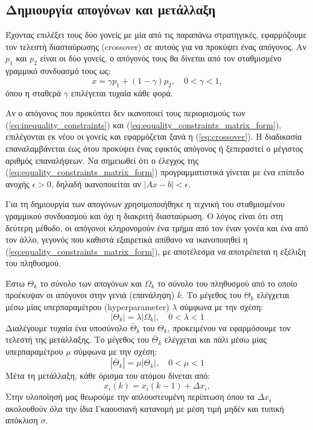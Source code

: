 \documentclass[a4paper,12pt]{article}
\begin{document}
\subsection{Δημιουργία απογόνων και μετάλλαξη}
Έχοντας επιλέξει τους δύο γονείς με μία από τις παραπάνω στρατηγικές, εφαρμόζουμε τον τελεστή διασταύρωσης
(crossover) σε αυτούς για να προκύψει ένας απόγονος. 
Αν $p_1$ και $p_2$ είναι οι δύο γονείς, ο απόγονός τους θα δίνεται από τον σταθμισμένο γραμμικό συνδυασμό τους ως:
\begin{equation}
    x = \gamma p_1 +(1 - \gamma) p_2, \quad 0 < \gamma < 1,
    \label{eq:crossover}
\end{equation}
όπου η σταθερά $\gamma$ επιλέγεται τυχαία κάθε φορά. 

Αν ο απόγονος που προκύπτει δεν ικανοποιεί τους περιορισμούς
των (\ref{eq:inequality_constraints}) και (\ref{eq:equality_constraints_matrix_form}), επιλέγονται εκ νέου οι γονείς
και εφαρμόζεται ξανά η (\ref{eq:crossover}). Η διαδικασία επαναλαμβάνεται έως ότου προκύψει ένας εφικτός απόγονος ή
ξεπεραστεί ο μέγιστος αριθμός επαναλήψεων. Να σημειωθεί ότι ο έλεγχος της (\ref{eq:equality_constraints_matrix_form})
προγραμματιστικά γίνεται με ένα επίπεδο ανοχής $\epsilon > 0$, δηλαδή ικανοποιείται αν $|Ax - b| < \epsilon$.

Για τη δημιουργία των απογόνων χρησιμοποιήθηκε η τεχνική του σταθμισμένου γραμμικού συνδυασμού και όχι η διακριτή
διασταύρωση. Ο λόγος είναι ότι στη δεύτερη μέθοδο, οι απόγονοι κληρονομούν ένα τμήμα από τον έναν γονέα και ένα από τον
άλλο, γεγονός που καθιστά εξαιρετικά απίθανο να ικανοποιηθεί η (\ref{eq:equality_constraints_matrix_form}), με 
αποτέλεσμα να αποτρέπεται η εξέλιξη του πληθυσμού.

Έστω $\Theta_k$ το σύνολο των απογόνων και $\Omega_k$ το σύνολο του πληθυσμού από το οποίο προέκυψαν οι απόγονοι
στην γενιά (επανάληψη) $k$. Το μέγεθος του $\Theta_k$ ελέγχεται μέσω μίας υπερπαραμέτρου 
(hyperparameter) $\lambda$ σύμφωνα με την σχέση:
\begin{equation}
    |\Theta_k| = \lambda |\Omega_k|, \quad 0 < \lambda < 1
    \label{eq:population_offspring_size}
\end{equation}
Διαλέγουμε τυχαία ένα υποσύνολο $\bar{\Theta}_k$ του $\Theta_k$, 
προκειμένου να εφαρμόσουμε τον τελεστή της μετάλλαξης. Το μέγεθος του $\bar{\Theta}_k$ ελέγχεται και πάλι μέσω μίας
υπερπαραμέτρου $\mu$ σύμφωνα με την σχέση:
\begin{equation}
    |\bar{\Theta}_k| = \mu |\Theta_k|, \quad 0 < \mu < 1
    \label{eq:offspring_mutation_size}
\end{equation}
Μέτα τη μετάλλαξη, κάθε όρισμα του ατόμου δίνεται από:
\begin{equation}
    x_i(k) = x_i(k-1) + \Delta x_i,
    \label{eq:mutation}
\end{equation}
Στην υλοποίησή μας θεωρούμε την απλουστευμένη περίπτωση όπου τα $\Delta x_i$ ακολουθούν όλα την ίδια Γκαουσιανή 
κατανομή με μέση τιμή μηδέν και τυπική απόκλιση $\sigma$. 
\end{document}
